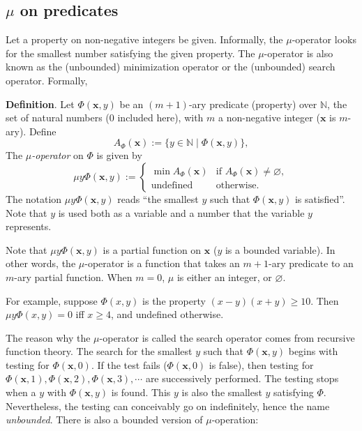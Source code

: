 \documentclass[12pt]{article}
\begin{document}
\subsection*{$\mu$ on predicates}

Let a property on non-negative integers be given.  Informally, the $\mu$-operator looks for the smallest number satisfying the given property.  The $\mu$-operator is also known as the (unbounded) minimization operator or the (unbounded) search operator.  Formally,

\textbf{Definition}.  Let $\Phi(\boldsymbol{x},y)$ be an $(m+1)$-ary predicate (property) over $\mathbb{N}$, the set of natural numbers ($0$ included here), with $m$ a non-negative integer ($\boldsymbol{x}$ is $m$-ary).  Define $$A_{\Phi}(\boldsymbol{x}):=\lbrace y \in \mathbb{N} \mid \Phi(\boldsymbol{x},y) \rbrace,$$ The \emph{$\mu$-operator} on $\Phi$ is given by 
\begin{displaymath}
\mu y \Phi(\boldsymbol{x},y) := \left\{
\begin{array}{ll}
\min A_{\Phi}(\boldsymbol{x}) & \textrm{if } A_{\Phi}(\boldsymbol{x})\ne \varnothing, \\
\textrm{undefined} & \textrm{otherwise.}
\end{array}
\right.
\end{displaymath}
The notation $\mu y \Phi(\boldsymbol{x},y)$ reads ``the smallest $y$ such that $\Phi(\boldsymbol{x},y)$ is satisfied''.  Note that $y$ is used both as a variable and a number that the variable $y$ represents.  

Note that $\mu y \Phi(\boldsymbol{x},y)$ is a partial function on $\boldsymbol{x}$ ($y$ is a bounded variable).  In other words, the $\mu$-operator is a function that takes an $m+1$-ary predicate to an $m$-ary partial function.  When $m=0$, $\mu$ is either an integer, or $\varnothing$.

For example, suppose $\Phi(x,y)$ is the property $(x-y)(x+y) \ge 10$.  Then $\mu y \Phi(x,y) = 0$ iff $x\ge 4$, and undefined otherwise.

The reason why the $\mu$-operator is called the search operator comes from recursive function theory.  The search for the smallest $y$ such that $\Phi(\boldsymbol{x},y)$ begins with testing for $\Phi(\boldsymbol{x},0)$.  If the test fails ($\Phi(\boldsymbol{x},0)$ is false), then testing for $\Phi(\boldsymbol{x},1), \Phi(\boldsymbol{x},2), \Phi(\boldsymbol{x},3), \cdots$ are successively performed.  The testing stops when a $y$ with $\Phi(\boldsymbol{x},y)$ is found.  This $y$ is also the smallest $y$ satisfying $\Phi$.  Nevertheless, the testing can conceivably go on indefinitely, hence the name \emph{unbounded}.  There is also a bounded version of $\mu$-operation:
\end{document}
